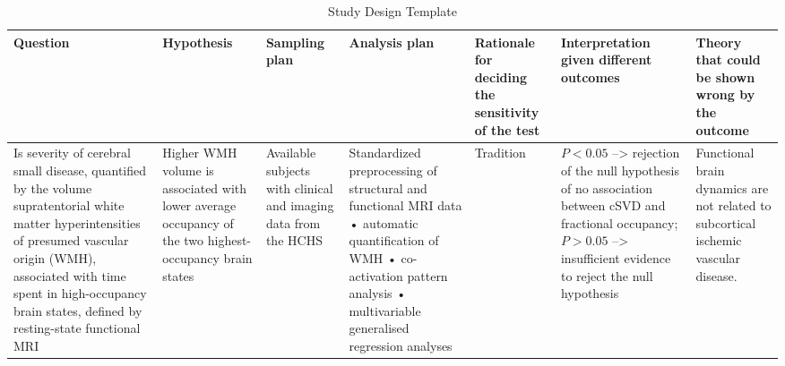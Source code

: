 \renewcommand\cellset{\renewcommand\arraystretch{0.5}%
    \setlength\extrarowheight{0pt}}
\begin{table}[bt]
    \scriptsize
    \begin{fullwidth}
        \begin{threeparttable}
            \begin{spacing}{0.8}\centering
                \begin{tabularx}{1.3\textwidth}{p{.2\linewidth} p{.1\linewidth} p{.09\linewidth} p{.15\linewidth} p{.09\linewidth} p{.14\linewidth} p{.08\linewidth}}
                    \toprule
                    Question   & Hypothesis     & Sampling plan     & Analysis plan   & Rationale for deciding the sensitivity of the test & Interpretation given different outcomes & Theory that could be shown wrong by the outcome \\
                    \midrule
                    Is severity of cerebral small disease, quantified by the volume supratentorial white matter hyperintensities of presumed vascular origin (WMH), associated with time spent in high-occupancy brain states, defined by resting-state functional MRI & 
                    Higher WMH volume is associated with lower average occupancy of the two highest-occupancy brain states & 
                    Available subjects with clinical and imaging data from the HCHS \citep{Jagodzinski2020-lx} & 
                    Standardized preprocessing of structural and functional MRI data • automatic quantification of WMH • co-activation pattern analysis • multivariable generalised regression analyses &
                    Tradition &
                    \makecell[tp{\linewidth}]{$P<0.05$ --> rejection of the null hypothesis of no association between cSVD and fractional occupancy;\\ $P>0.05$ --> insufficient evidence to reject the null hypothesis}    &
                    Functional brain dynamics are not related to subcortical ischemic vascular disease.    \\
                    \bottomrule
                \end{tabularx}
            \end{spacing}
            \bigskip
            \caption{Study Design Template}
        \end{threeparttable}
    \end{fullwidth}
\end{table}
